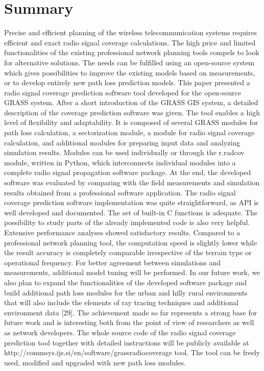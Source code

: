 \section{Summary}

Precise and efficient planning of the wireless telecommunication systems
requires efficient and exact radio signal coverage calculations. The
high price and limited functionalities of the existing professional
network planning tools compels to look for alternative solutions.
The needs can be fulfilled using an open-source system which gives
possibilities to improve the existing models based on measurements,
or to develop entirely new path loss prediction models. This paper
presented a radio signal coverage prediction software tool developed
for the open-source GRASS system. After a short introduction of the
GRASS GIS system, a detailed description of the coverage prediction
software was given. The tool enables a high level of flexibility and
adaptability. It is composed of several GRASS modules for path loss
calculation, a sectorization module, a module for radio signal coverage
calculation, and additional modules for preparing input data and analyzing
simulation results. Modules can be used individually or through the
r.radcov module, written in Python, which interconnects individual
modules into a complete radio signal propagation software package.
At the end, the developed software was evaluated by comparing with
the field measurements and simulation results obtained from a professional
software application. The radio signal coverage prediction software
implementation was quite straightforward, as API is well developed
and documented. The set of built-in C functions is adequate. The possibility
to study parts of the already implemented code is also very helpful.
Extensive performance analyses showed satisfactory results. Compared
to a professional network planning tool, the computation speed is
slightly lower while the result accuracy is completely comparable
irrespective of the terrain type or operational frequency. For better
agreement between simulations and measurements, additional model tuning
will be performed. In our future work, we also plan to expand the
functionalities of the developed software package and build additional
path loss modules for the urban and hilly rural environments that
will also include the elements of ray tracing techniques and additional
environment data {[}29{]}. The achievement made so far represents
a strong base for future work and is interesting both from the point
of view of researchers as well as network developers. The whole source
code of the radio signal coverage prediction tool together with detailed
instructions will be publicly available at http://commsys.ijs.si/en/software/grassradiocoverage
tool. The tool can be freely used, modified and upgraded with new
path loss modules.
